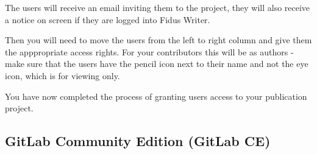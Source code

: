 \documentclass{article}
\begin{document}
The users will receive an email inviting them to the project, they will also receive a notice on screen if they are logged into Fidus Writer.


Then you will need to move the users from the left to right column and give them the apppropriate access rights. For your contributors this will be as authors - make sure that the users have the pencil icon next to their name and not the eye icon, which is for viewing only.


You have now completed the process of granting users access to your publication project.


\subsection{GitLab Community Edition (GitLab CE)}\label{H7934822}
\end{document}
